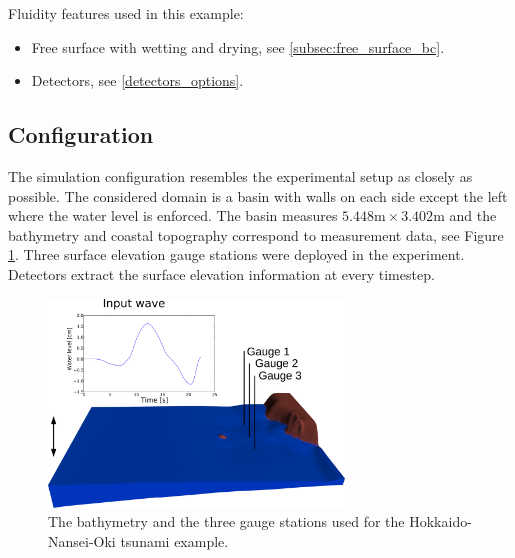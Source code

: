 Fluidity features used in this example:
\begin{itemize}
\item Free surface with wetting and drying, see \ref{subsec:free_surface_bc}.
\item Detectors, see \ref{detectors_options}.
\end{itemize}

\subsection{Configuration}
The simulation configuration resembles the experimental setup as closely as possible. 
The considered domain is a basin with walls on each side except the left where the water level is enforced. 
The basin measures $5.448\mbox{m} \times 3.402\mbox{m}$ and the bathymetry and coastal topography correspond to measurement data, see Figure \ref{fig:monai_inputwave}.
Three surface elevation gauge stations were deployed in the experiment.
Detectors  extract the surface elevation information at every timestep. 
\begin{figure}
\begin{center}
\includegraphics[width=0.7\textwidth]{./examples_images/hokkaido-nansei-oki_tsunami/MonaiValleyDomainWithInputWave2_png.pdf}
\end{center}
\caption{The bathymetry and the three gauge stations used for the Hokkaido-Nansei-Oki tsunami example.}\label{fig:monai_inputwave}
\end{figure}

